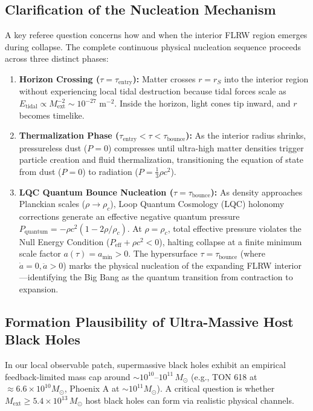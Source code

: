 \documentclass[11pt,a4paper]{article}
\theoremstyle{definition}
\begin{document}
\subsection{Clarification of the Nucleation Mechanism}\label{sec:nucleation}
A key referee question concerns how and when the interior FLRW region emerges during collapse. The complete continuous physical nucleation sequence proceeds across three distinct phases:
\begin{enumerate}
    \item \textbf{Horizon Crossing ($\tau = \tau_{\text{entry}}$):} Matter crosses $r = r_S$ into the interior region without experiencing local tidal destruction because tidal forces scale as $E_{\text{tidal}} \propto M_{\text{ext}}^{-2} \sim 10^{-27} \text{ m}^{-2}$. Inside the horizon, light cones tip inward, and $r$ becomes timelike.
    \item \textbf{Thermalization Phase ($\tau_{\text{entry}} < \tau < \tau_{\text{bounce}}$):} As the interior radius shrinks, pressureless dust ($P=0$) compresses until ultra-high matter densities trigger particle creation and fluid thermalization, transitioning the equation of state from dust ($P=0$) to radiation ($P = \frac{1}{3}\rho c^2$).
    \item \textbf{LQC Quantum Bounce Nucleation ($\tau = \tau_{\text{bounce}}$):} As density approaches Planckian scales ($\rho \to \rho_c$), Loop Quantum Cosmology (LQC) holonomy corrections generate an effective negative quantum pressure $P_{\text{quantum}} = -\rho c^2 (1 - 2\rho/\rho_c)$. At $\rho = \rho_c$, total effective pressure violates the Null Energy Condition ($P_{\text{eff}} + \rho c^2 < 0$), halting collapse at a finite minimum scale factor $a(\tau) = a_{\text{min}} > 0$. The hypersurface $\tau = \tau_{\text{bounce}}$ (where $\dot{a} = 0, \ddot{a} > 0$) marks the physical nucleation of the expanding FLRW interior---identifying the Big Bang as the quantum transition from contraction to expansion.
\end{enumerate}

\subsection{Formation Plausibility of Ultra-Massive Host Black Holes}\label{sec:formation_plausibility}
In our local observable patch, supermassive black holes exhibit an empirical feedback-limited mass cap around $\sim 10^{10} \text{--} 10^{11} \, M_\odot$ (e.g., TON 618 at $\approx 6.6 \times 10^{10} M_\odot$, Phoenix A at $\sim 10^{11} M_\odot$). A critical question is whether $M_{\text{ext}} \ge 5.4 \times 10^{13} \, M_\odot$ host black holes can form via realistic physical channels.
\end{document}

